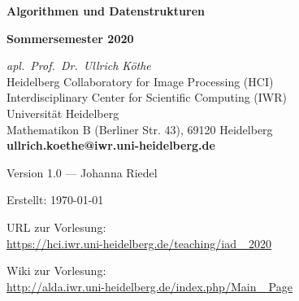 \documentclass[11pt, fleqn]{scrreprt}
\begin{document}
\thispagestyle{plain}
\begin{titlepage}

    \begin{center}
        {\LARGE\textbf{Algorithmen und Datenstrukturen}} \medskip

        {\LARGE\textbf{Sommersemester 2020}}

        \vspace{3.7cm}

        {\large \textit{apl.\ Prof.\ Dr.\ Ullrich Köthe}} \\[2em]
        {\small Heidelberg Collaboratory for Image Processing (HCI)} \\
        {\small Interdisciplinary Center for Scientific Computing (IWR)} \\
        {\small Universität Heidelberg } \\
        {\small Mathematikon B (Berliner Str. 43), 69120 Heidelberg} \\
        \textbf{ullrich.koethe@iwr.uni-heidelberg.de}

        \vspace{8cm}

        Version 1.0 --- Johanna Riedel

        \bigskip

        Erstellt: \today

        \bigskip

        URL zur Vorlesung:  \\

        \url{https://hci.iwr.uni-heidelberg.de/teaching/iad\_ 2020}

        \bigskip

        Wiki zur Vorlesung: \\

        \url{http://alda.iwr.uni-heidelberg.de/index.php/Main\_ Page}



    \end{center}
\end{titlepage}
\restoregeometry{}

\tableofcontents

\newpage












\end{document}
